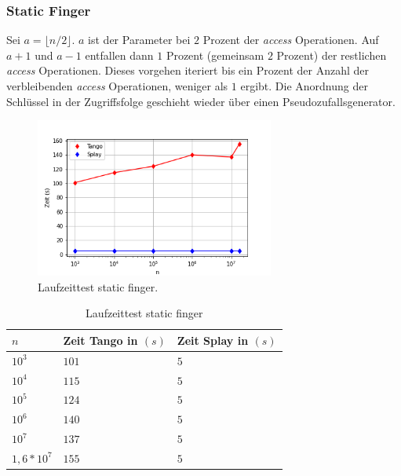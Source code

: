 \documentclass[a4paper,12pt]{article}
\begin{document}
\subsubsection{Static Finger}
Sei $a = \lfloor n / 2\rfloor$.  $a$ ist der Parameter bei $2$ Prozent der \textit{access} Operationen. Auf $a+1$ und $a-1$ entfallen dann $1$ Prozent (gemeinsam $2$ Prozent) der restlichen \textit{access} Operationen. Dieses vorgehen iteriert bis ein Prozent der Anzahl der verbleibenden \textit{access} Operationen, weniger als $1$ ergibt. Die Anordnung der Schlüssel in der Zugriffsfolge geschieht wieder über einen Pseudozufallsgenerator. 
 \begin{figure}[H]
 	\centering
 	\includegraphics[width=0.7\textwidth]{"Medien/laufzeittest/diagramm/staticfinger"}
 	\caption{Laufzeittest static finger.}
 \end{figure}
 \begin{table}[H]
	\begin{center}
		\begin{tabular}[c]{|l|l|l|}
			\hline
			$n$ & Zeit Tango in $\left(s\right)$ &Zeit Splay in $\left(s\right)$ \\
			\hline
			$10^3$ & $101$ &$5$ \\
			\hline
			$10^4$  & $115$ &$5$  \\
			\hline
			$10^5$  & $124$ &$5$  \\
			\hline
			$10^6$  & $140$ &$5$  \\
			\hline
			$10^7$  & $137$ &$5$  \\
			\hline
			$1,6 *10^7$  & $155$ &$5$  \\
			\hline
		\end{tabular}
		\caption{Laufzeittest static finger} 
	\end{center}
\end{table}
\end{document}
